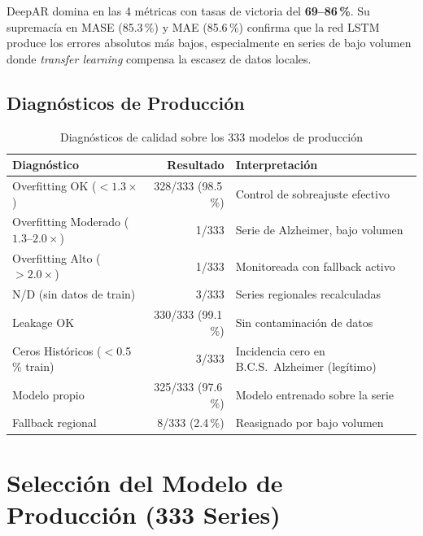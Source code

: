 \documentclass[12pt, letterpaper]{article}
\begin{document}
DeepAR domina en las 4 métricas con tasas de victoria del \textbf{69--86\,\%}. Su supremacía en MASE (85.3\,\%) y MAE (85.6\,\%) confirma que la red LSTM produce los errores absolutos más bajos, especialmente en series de bajo volumen donde \textit{transfer learning} compensa la escasez de datos locales.

\subsection{Diagnósticos de Producción}

\begin{table}[H]
\centering
\caption{Diagnósticos de calidad sobre los 333 modelos de producción}
\label{tab:diagnostics}
\small
\begin{tabular}{lrl}
\toprule
\textbf{Diagnóstico} & \textbf{Resultado} & \textbf{Interpretación} \\
\midrule
Overfitting OK ($<1.3\times$)          & 328/333 (98.5\,\%) & Control de sobreajuste efectivo \\
Overfitting Moderado ($1.3$--$2.0\times$) & 1/333          & Serie de Alzheimer, bajo volumen \\
Overfitting Alto ($>2.0\times$)         & 1/333          & Monitoreada con fallback activo \\
N/D (sin datos de train)              & 3/333          & Series regionales recalculadas \\
\midrule
Leakage OK                            & 330/333 (99.1\,\%) & Sin contaminación de datos \\
Ceros Históricos ($<$0.5\,\% train)   & 3/333          & Incidencia cero en B.C.S.\ Alzheimer (legítimo) \\
\midrule
Modelo propio                          & 325/333 (97.6\,\%) & Modelo entrenado sobre la serie \\
Fallback regional                      & 8/333 (2.4\,\%)   & Reasignado por bajo volumen \\
\bottomrule
\end{tabular}
\end{table}

\newpage

\section{Selección del Modelo de Producción (333 Series)}\label{sec:seleccion}
\end{document}
